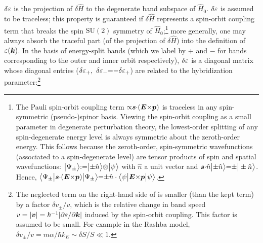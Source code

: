 \documentclass[aps, showpacs, twocolumn, notitlepage, superscriptaddress]{revtex4-1}
\begin{document}
$\delta \varepsilon$ is the projection of $\delta \hat{H}$ to the degenerate band subspace of $\hat{H}_0$. $\delta \varepsilon$ is assumed to be traceless; this property is guaranteed if $\delta \hat{H}$ represents a spin-orbit coupling term that breaks the spin $\text{SU}(2)$ symmetry of $\hat{H}_0$;\footnote{The Pauli spin-orbit coupling term ${\propto} \boldsymbol{s}{\cdot} (\boldsymbol{E} {\times} \boldsymbol{p})$ is traceless in any spin-symmetric (pseudo-)spinor basis.  Viewing the spin-orbit coupling as a small parameter in degenerate perturbation theory, the lowest-order splitting of any spin-degenerate energy level is always symmetric about the zeroth-order energy. This follows because the zeroth-order, spin-symmetric wavefunctions (associated to a spin-degenerate level) are tensor products of spin and spatial wavefunctions: $\big|\Psi_{\pm}\big\rangle{:}{=}\big|{\pm}\hat{n}\big\rangle{\otimes} \big|\psi\big\rangle$ with $\hat{n}$ a unit vector and  $\boldsymbol{s}{\cdot} \hat{n} \big|{\pm}\hat{n}\big\rangle{=}{\pm}\big|\pm \hat{n}\big\rangle$. Hence, $\big\langle \Psi_{\pm} \big| \boldsymbol{s}{\cdot} (\boldsymbol{E} {\times} \boldsymbol{p}) \big| \Psi_{\pm} \big\rangle{=}{\pm}\hat{n}\cdot\big\langle \psi \big| \boldsymbol{E} {\times} \boldsymbol{p} \big| \psi \big\rangle$.} more generally, one may always absorb the traceful part (of  the projection of $\delta \hat{H}$) into the definition of $\varepsilon(\boldsymbol{k})$.  In the basis of energy-split bands (which we label by ${+}$ and $-$ for bands corresponding to the outer and inner orbit respectively), $\delta \varepsilon$ is a diagonal matrix whose diagonal entries ($\delta \varepsilon_+,~\delta \varepsilon_-{=}{-}\delta \varepsilon_+$)  are related to the hybridization parameter:\footnote{The neglected term on the right-hand side of  is smaller (than the kept term) by a factor $\delta v_{\pm}/v$, which is the relative change in band speed $v=|\boldsymbol{v}|=\hbar^{-1}|\partial \varepsilon/\partial \boldsymbol{k}|$ induced by the spin-orbit coupling. This factor is assumed to be small.  For example in the Rashba model, $\delta v_{\pm}/v=m\alpha/\hbar k_E{\sim}\delta S/S{\ll}1$.}   
\end{document}

